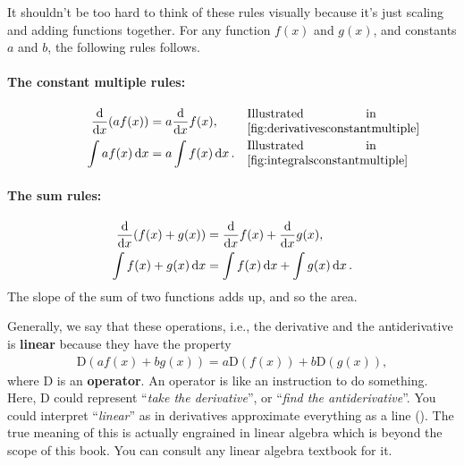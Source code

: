 It shouldn't be too hard to think of these rules visually because it's just scaling and adding functions together. For any function $f(x)$ and $g(x)$, and constants $a$ and $b$, the following rules follows.
\paragraph{The constant multiple rules:}
\begin{align}
    \dv{x}(af(x)) &= a\dv{x}f(x), &\alc[0.3]{Illustrated in \cref{fig:derivativesconstantmultiple}}\label{eq:derivativesconstantmultiple} \\
    \int af(x)\dd{x} &= a\int f(x)\dd{x}. &\alc[0.3]{Illustrated in \cref{fig:integralsconstantmultiple}}\label{eq:integralsconstantmultiple}
\end{align}

\paragraph{The sum rules:}
\begin{align}
    \dv{x}(f(x) + g(x)) &= \dv{x}f(x) + \dv{x}g(x), \label{eq:derivativesumrule}\\
    \int f(x) + g(x)\dd{x} &= \int f(x)\dd{x} + \int g(x)\dd{x}. \label{eq:integralssumrule}
\end{align}
The slope of the sum of two functions adds up, and so the area.

Generally, we say that these operations, i.e., the derivative and the antiderivative is \textbf{linear} because they have the property
\begin{gather*}
    \mathrm{D}(af(x) + bg(x)) = a\mathrm{D}(f(x)) + b\mathrm{D}(g(x)),
\end{gather*}
where $\mathrm{D}$ is an \textbf{operator}. An operator is like an instruction to do something. Here, $\mathrm{D}$ could represent ``\emph{take the derivative}'', or ``\emph{find the antiderivative}''. You could interpret ``\emph{linear}'' as in derivatives approximate everything as a line (). The true meaning of this is actually engrained in linear algebra which is beyond the scope of this book. You can consult any linear algebra textbook for it.

